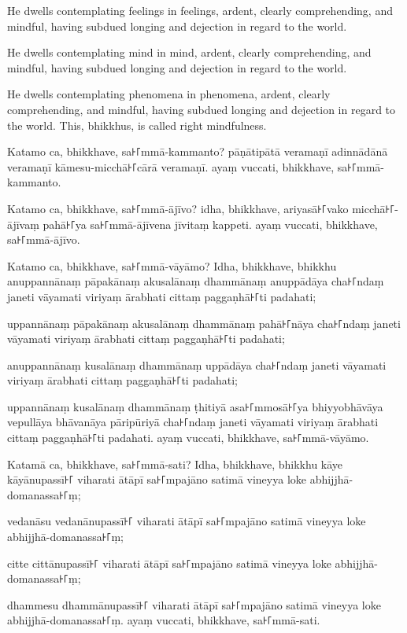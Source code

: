 He dwells contemplating feelings in feelings, ardent, clearly comprehending, and
mindful, having subdued longing and dejection in regard to the world.

He dwells contemplating mind in mind, ardent, clearly comprehending, and
mindful, having subdued longing and dejection in regard to the world.

He dwells contemplating phenomena in phenomena, ardent, clearly comprehending,
and mindful, having subdued longing and dejection in regard to the world. This,
bhikkhus, is called right mindfulness.

\paliPage

Katamo ca, bhikkhave, sa꜔꜒mmā-kammanto? pāṇātipātā veramaṇī adinnādānā veramaṇī
kāmesu-micchā꜔꜒cārā veramaṇī. ayaṃ vuccati, bhikkhave, sa꜔꜒mmā-kammanto.

Katamo ca, bhikkhave, sa꜔꜒mmā-ājīvo? idha, bhikkhave, ariyasā꜔꜒vako micchā꜔꜒-ājīvaṃ
pahā꜔꜒ya sa꜔꜒mmā-ājīvena jīvitaṃ kappeti. ayaṃ vuccati, bhikkhave, sa꜔꜒mmā-ājīvo.

Katamo ca, bhikkhave, sa꜔꜒mmā-vāyāmo? Idha, bhikkhave, bhikkhu
anuppannānaṃ pāpakānaṃ akusalānaṃ dhammānaṃ
anuppādāya cha꜔꜒ndaṃ janeti vāyamati viriyaṃ ārabhati cittaṃ paggaṇhā꜔꜒ti padahati;

uppannānaṃ pāpakānaṃ akusalānaṃ dhammānaṃ
pahā꜔꜒nāya cha꜔꜒ndaṃ janeti vāyamati viriyaṃ ārabhati cittaṃ paggaṇhā꜔꜒ti padahati;

anuppannānaṃ kusalānaṃ dhammānaṃ
uppādāya cha꜔꜒ndaṃ janeti vāyamati viriyaṃ ārabhati cittaṃ paggaṇhā꜔꜒ti padahati;

uppannānaṃ kusalānaṃ dhammānaṃ
ṭhitiyā asa꜔꜒mmosā꜔꜒ya bhiyyobhāvāya vepullāya
bhāvanāya pāripūriyā cha꜔꜒ndaṃ janeti vāyamati viriyaṃ ārabhati cittaṃ paggaṇhā꜔꜒ti
padahati. ayaṃ vuccati, bhikkhave, sa꜔꜒mmā-vāyāmo.

Katamā ca, bhikkhave, sa꜔꜒mmā-sati? Idha, bhikkhave, bhikkhu kāye kāyānupassī꜔꜒
viharati ātāpī sa꜔꜒mpajāno satimā vineyya loke abhijjhā-domanassa꜔꜒ṃ;

vedanāsu vedanānupassī꜔꜒ viharati ātāpī sa꜔꜒mpajāno satimā vineyya loke
abhijjhā-domanassa꜔꜒ṃ;

\enlargethispage{\baselineskip}

citte cittānupassī꜔꜒ viharati ātāpī sa꜔꜒mpajāno satimā vineyya loke
abhijjhā-domanassa꜔꜒ṃ;

dhammesu dhammānupassī꜔꜒ viharati ātāpī sa꜔꜒mpajāno satimā vineyya loke
abhijjhā-domanassa꜔꜒ṃ. ayaṃ vuccati, bhikkhave, sa꜔꜒mmā-sati.

\englishPage


